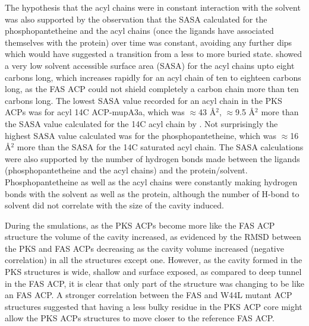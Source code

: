 The hypothesis that the acyl chains were in constant interaction with the solvent was also supported by the observation that the SASA calculated for the phosphopantetheine and the acyl chains (once the ligands have associated themselves with the protein)  over time was constant,  avoiding any further dips which would have suggested a transition from a less to more buried state. \textcite{Chan2008} showed a very low solvent accessible surface area (SASA) for the acyl chains upto eight carbons long, which increases rapidly for an acyl chain of ten to eighteen carbons long, as the FAS ACP could not shield completely a carbon chain more than ten carbons long. The lowest SASA value recorded for an acyl chain in the PKS ACPs was for acyl 14C ACP-mupA3a, which was $ \approx $43 \AA$ ^{2} $, $ \approx $9.5 \AA$ ^{2} $ more than the SASA value calculated for the 14C acyl chain by \textcite{Chan2008}. Not surprisingly the highest SASA value calculated was for the phosphopantetheine, which was $ \approx $16 \AA$ ^{2} $ more than the SASA for the 14C saturated acyl chain. The SASA calculations were also supported by the number of hydrogen bonds made between the ligands (phosphopantetheine and the acyl chains) and the protein/solvent. Phosphopantetheine as well as the acyl chains were constantly making hydrogen bonds with the solvent as well as the protein, although the number of H-bond to solvent did not correlate with the size of the cavity induced. 

During the smulations, as the PKS ACPs become more like the FAS ACP structure the volume of the cavity increased, as evidenced by the RMSD between the PKS and FAS ACPs decreasing as the cavity volume increased (negative correlation) in all the structures except one. %
However, as the cavity formed in the PKS structures is wide, shallow and surface exposed, as compared to deep tunnel in the FAS ACP, it is clear that only part of the structure was changing to be like an FAS ACP. A stronger correlation between the FAS and W44L mutant ACP structures suggested that having a less bulky residue in the PKS ACP core might allow the PKS ACPs structures to move closer to the reference FAS ACP. 

